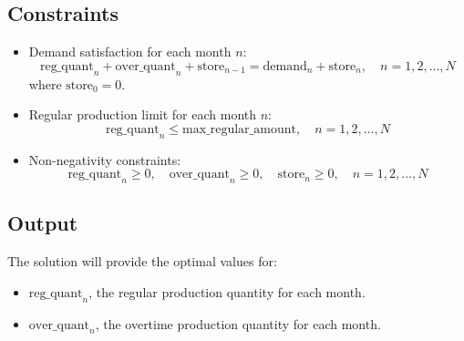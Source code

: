 \documentclass{article}
\begin{document}
\subsection*{Constraints}
\begin{itemize}
    \item Demand satisfaction for each month \( n \):
    \[
    \text{reg\_quant}_{n} + \text{over\_quant}_{n} + \text{store}_{n-1} = \text{demand}_{n} + \text{store}_{n}, \quad n = 1, 2, \ldots, N
    \]
    where \( \text{store}_{0} = 0 \).

    \item Regular production limit for each month \( n \):
    \[
    \text{reg\_quant}_{n} \leq \text{max\_regular\_amount}, \quad n = 1, 2, \ldots, N
    \]

    \item Non-negativity constraints:
    \[
    \text{reg\_quant}_{n} \geq 0, \quad \text{over\_quant}_{n} \geq 0, \quad \text{store}_{n} \geq 0, \quad n = 1, 2, \ldots, N
    \]
\end{itemize}

\subsection*{Output}
The solution will provide the optimal values for:
\begin{itemize}
    \item \( \text{reg\_quant}_{n} \), the regular production quantity for each month.
    \item \( \text{over\_quant}_{n} \), the overtime production quantity for each month.
\end{itemize}
\end{document}
